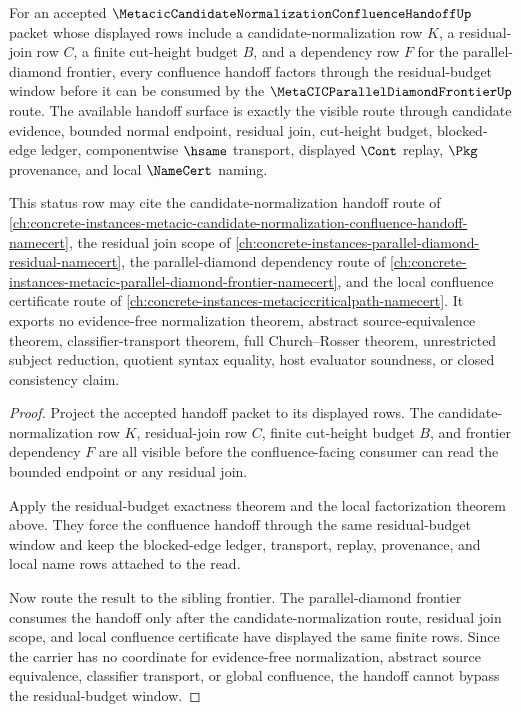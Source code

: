 \begin{theorem}
\label{thm:metacic-candidate-normalization-confluence-handoff-status}
For an accepted $\MetacicCandidateNormalizationConfluenceHandoffUp$ packet whose displayed rows include a candidate-normalization row $K$, a residual-join row $C$, a finite cut-height budget $B$, and a dependency row $F$ for the parallel-diamond frontier, every confluence handoff factors through the residual-budget window before it can be consumed by the $\MetaCICParallelDiamondFrontierUp$ route. The available handoff surface is exactly the visible route through candidate evidence, bounded normal endpoint, residual join, cut-height budget, blocked-edge ledger, componentwise $\hsame$ transport, displayed $\Cont$ replay, $\Pkg$ provenance, and local $\NameCert$ naming.

This status row may cite the candidate-normalization handoff route of \autoref{ch:concrete-instances-metacic-candidate-normalization-confluence-handoff-namecert}, the residual join scope of \autoref{ch:concrete-instances-parallel-diamond-residual-namecert}, the parallel-diamond dependency route of \autoref{ch:concrete-instances-metacic-parallel-diamond-frontier-namecert}, and the local confluence certificate route of \autoref{ch:concrete-instances-metaciccriticalpath-namecert}. It exports no evidence-free normalization theorem, abstract source-equivalence theorem, classifier-transport theorem, full Church--Rosser theorem, unrestricted subject reduction, quotient syntax equality, host evaluator soundness, or closed consistency claim.
\end{theorem}
\begin{proof}
Project the accepted handoff packet to its displayed rows. The candidate-normalization row $K$, residual-join row $C$, finite cut-height budget $B$, and frontier dependency $F$ are all visible before the confluence-facing consumer can read the bounded endpoint or any residual join.

Apply the residual-budget exactness theorem and the local factorization theorem above. They force the confluence handoff through the same residual-budget window and keep the blocked-edge ledger, transport, replay, provenance, and local name rows attached to the read.

Now route the result to the sibling frontier. The parallel-diamond frontier consumes the handoff only after the candidate-normalization route, residual join scope, and local confluence certificate have displayed the same finite rows. Since the carrier has no coordinate for evidence-free normalization, abstract source equivalence, classifier transport, or global confluence, the handoff cannot bypass the residual-budget window.
\end{proof}

